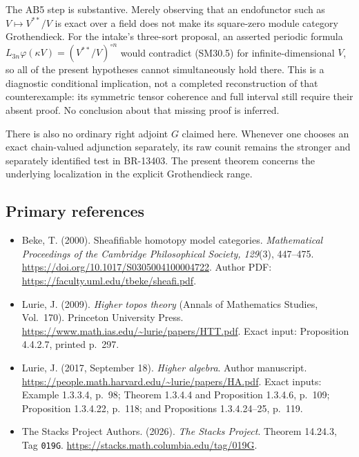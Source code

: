 The AB5 step is substantive.  Merely observing that an
endofunctor such as \(V\mapsto V^{**}/V\) is exact over a field
does not make its square-zero module category Grothendieck.
For the intake's three-sort proposal, an asserted periodic
formula \(L_{3n}\varphi(\kappa V)=(V^{**}/V)^{\circ n}\)
would contradict (SM30.5) for infinite-dimensional \(V\),
so all of the present hypotheses cannot simultaneously hold
there.  This is a diagnostic conditional implication, not a
completed reconstruction of that counterexample: its symmetric
tensor coherence and full interval still require their absent
proof.  No conclusion about that missing proof is inferred.

There is also no ordinary right adjoint \(G\) claimed here.
Whenever one chooses an exact chain-valued adjunction separately,
its raw counit remains the stronger and separately identified
test in BR-13403.  The present theorem concerns the underlying
localization in the explicit Grothendieck range.

\subsection{Primary references}
\begin{itemize}
\item Beke, T. (2000). Sheafifiable homotopy model categories.
\emph{Mathematical Proceedings of the Cambridge Philosophical
Society, 129}(3), 447--475.
\url{https://doi.org/10.1017/S0305004100004722}.
Author PDF: \url{https://faculty.uml.edu/tbeke/sheafi.pdf}.
\item Lurie, J. (2009). \emph{Higher topos theory}
(Annals of Mathematics Studies, Vol.~170). Princeton University
Press. \url{https://www.math.ias.edu/~lurie/papers/HTT.pdf}.
Exact input: Proposition 4.4.2.7, printed p.~297.
\item Lurie, J. (2017, September 18). \emph{Higher algebra}.
Author manuscript.
\url{https://people.math.harvard.edu/~lurie/papers/HA.pdf}.
Exact inputs: Example 1.3.3.4, p.~98; Theorem 1.3.4.4 and
Proposition 1.3.4.6, p.~109; Proposition 1.3.4.22, p.~118; and Propositions
1.3.4.24--25, p.~119.
\item The Stacks Project Authors. (2026). \emph{The Stacks
Project}. Theorem 14.24.3, Tag \texttt{019G}.
\url{https://stacks.math.columbia.edu/tag/019G}.
\end{itemize}
